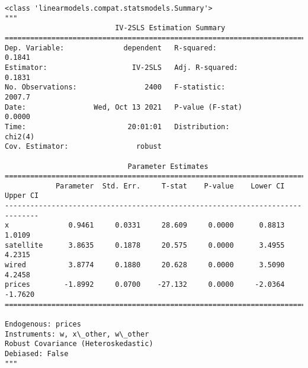            \begin{tcolorbox}[breakable, size=fbox, boxrule=.5pt, pad at break*=1mm, opacityfill=0]
\begin{Verbatim}[commandchars=\\\{\}]
<class 'linearmodels.compat.statsmodels.Summary'>
"""
                          IV-2SLS Estimation Summary
==============================================================================
Dep. Variable:              dependent   R-squared:                      0.1841
Estimator:                    IV-2SLS   Adj. R-squared:                 0.1831
No. Observations:                2400   F-statistic:                    2007.7
Date:                Wed, Oct 13 2021   P-value (F-stat)                0.0000
Time:                        20:01:01   Distribution:                  chi2(4)
Cov. Estimator:                robust

                             Parameter Estimates
==============================================================================
            Parameter  Std. Err.     T-stat    P-value    Lower CI    Upper CI
------------------------------------------------------------------------------
x              0.9461     0.0331     28.609     0.0000      0.8813      1.0109
satellite      3.8635     0.1878     20.575     0.0000      3.4955      4.2315
wired          3.8774     0.1880     20.628     0.0000      3.5090      4.2458
prices        -1.8992     0.0700    -27.132     0.0000     -2.0364     -1.7620
==============================================================================

Endogenous: prices
Instruments: w, x\_other, w\_other
Robust Covariance (Heteroskedastic)
Debiased: False
"""
\end{Verbatim}
\end{tcolorbox}

